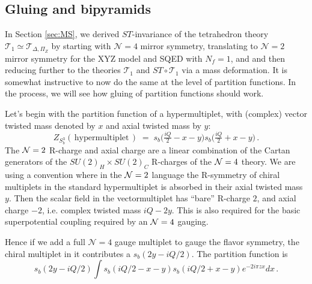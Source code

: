 \documentclass[hyper,letterpaper]{JHEP3}
\numberwithin{equation}{section}
\newcommand{\CN}{\mathcal{N}}
\newcommand{\CT}{\mathcal{T}}
\begin{document}
\subsection{Gluing and bipyramids}

In Section \ref{sec:MS}, we derived $ST$-invariance of the tetrahedron theory $\CT_1\simeq \CT_{\Delta,\Pi_Z}$ by starting with $\CN=4$ mirror symmetry, translating to $\CN=2$ mirror symmetry for the XYZ model and SQED with $N_f=1$, and and then reducing further to the theories $\CT_1$ and $ST\circ \CT_1$ via a mass deformation. It is somewhat instructive to now do the same at the level of partition functions. In the process, we will see how gluing of partition functions should work.



Let's begin with the partition function of a hypermultiplet,
with (complex) vector twisted mass denoted by $x$ and axial twisted mass by $y$:
\begin{equation}
Z_{S^3_b} (\, \text{hypermultiplet} \, ) \; = \; s_b \big( \tfrac{iQ}{2} -x -y \big) s_b \big( \tfrac{iQ}{2} +x -y \big)\,.
\label{Zhyper}
\end{equation}
%
The ${\cal N}=2$ R-charge and axial charge are a linear combination of the Cartan generators of the $SU(2)_H \times SU(2)_C$ R-charges of the 
${\cal N}=4$ theory. We are using a convention where in the ${\cal N}=2$ language the R-symmetry of chiral multiplets in the standard hypermultiplet is 
absorbed in their axial twisted mass $y$. Then the scalar field in the vectormultiplet has ``bare'' R-charge $2$, and axial charge $-2$, i.e. complex twisted mass $i Q -2y$.
This is also required for the basic superpotential coupling required by an ${\cal N}=4$ gauging. 

Hence if we add a full $\CN=4$ gauge multiplet to gauge the flavor symmetry,
the chiral multiplet in it contributes a $s_b(2 y - i Q/2)$. 
The partition function is
\begin{equation}
s_b(2 y - i Q/2) \int s_b(i Q/2-x -y) s_b(i Q/2+x -y) e^{- 2 i \pi z x } dx\,.
\end{equation}
\end{document}
